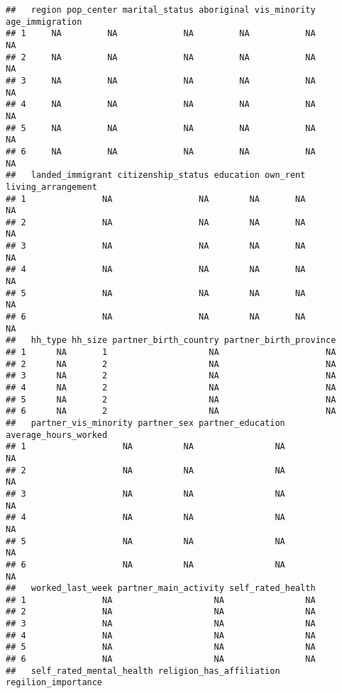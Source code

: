 \documentclass[
]{article}
\begin{document}
\begin{verbatim}
##   region pop_center marital_status aboriginal vis_minority age_immigration
## 1     NA         NA             NA         NA           NA              NA
## 2     NA         NA             NA         NA           NA              NA
## 3     NA         NA             NA         NA           NA              NA
## 4     NA         NA             NA         NA           NA              NA
## 5     NA         NA             NA         NA           NA              NA
## 6     NA         NA             NA         NA           NA              NA
##   landed_immigrant citizenship_status education own_rent living_arrangement
## 1               NA                 NA        NA       NA                 NA
## 2               NA                 NA        NA       NA                 NA
## 3               NA                 NA        NA       NA                 NA
## 4               NA                 NA        NA       NA                 NA
## 5               NA                 NA        NA       NA                 NA
## 6               NA                 NA        NA       NA                 NA
##   hh_type hh_size partner_birth_country partner_birth_province
## 1      NA       1                    NA                     NA
## 2      NA       2                    NA                     NA
## 3      NA       2                    NA                     NA
## 4      NA       2                    NA                     NA
## 5      NA       2                    NA                     NA
## 6      NA       2                    NA                     NA
##   partner_vis_minority partner_sex partner_education average_hours_worked
## 1                   NA          NA                NA                   NA
## 2                   NA          NA                NA                   NA
## 3                   NA          NA                NA                   NA
## 4                   NA          NA                NA                   NA
## 5                   NA          NA                NA                   NA
## 6                   NA          NA                NA                   NA
##   worked_last_week partner_main_activity self_rated_health
## 1               NA                    NA                NA
## 2               NA                    NA                NA
## 3               NA                    NA                NA
## 4               NA                    NA                NA
## 5               NA                    NA                NA
## 6               NA                    NA                NA
##   self_rated_mental_health religion_has_affiliation regilion_importance

\end{verbatim}
\end{document}

